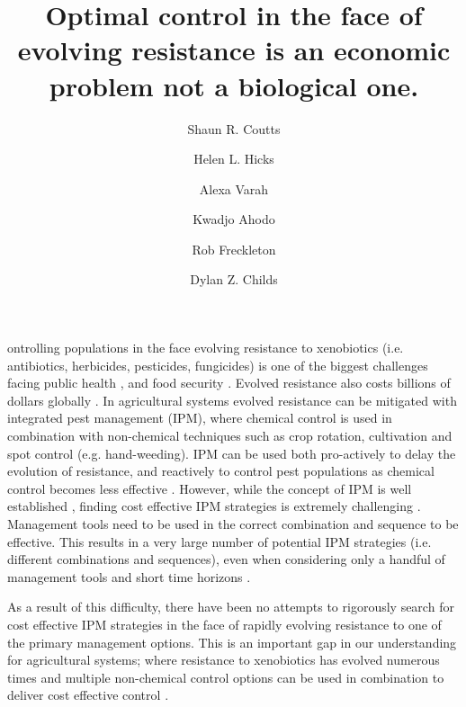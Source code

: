 \documentclass[9pt,twocolumn,twoside,lineno]{pnas-new}
\title{Optimal control in the face of evolving resistance is an economic problem not a biological one.}
\author[a,1]{Shaun R. Coutts}
\author[a]{Helen L. Hicks}
\author[b]{Alexa Varah}
\author[c]{Kwadjo Ahodo}
\author[a]{Rob Freckleton}
\author[a]{Dylan Z. Childs}
\affil[a]{Animal and Plant Sciences, University of Sheffield, Sheffield S10 2TN, UK}
\affil[b]{Zoological Society of London, London NW1 4RY, UK}
\affil[c]{Kwadjo What should I put down here}
\begin{document}
\verticaladjustment{-2pt}

\maketitle
\thispagestyle{firststyle}

ontrolling populations in the face evolving resistance to xenobiotics (i.e. antibiotics, herbicides, pesticides, fungicides) is one of the biggest challenges facing public health \citep{Laxm2016, Willy2017}, and food security \citep{Denh1992, Palu2001, Hick2018}. Evolved resistance also costs billions of dollars globally \citep{Livi2016, Ches2018, Hick2018}. In agricultural systems evolved resistance can be mitigated with integrated pest management (IPM), where chemical control is used in combination with non-chemical techniques such as crop rotation, cultivation and spot control (e.g. hand-weeding). IPM can be used both pro-actively to delay the evolution of resistance, and reactively to control pest populations as chemical control becomes less effective \citep{Denh1992, Hick2018}. However, while the concept of IPM is well established \citep{Bott1979}, finding cost effective IPM strategies is extremely challenging \citep{Dana2014, Chal2015}. Management tools need to be used in the correct combination and sequence to be effective. This results in a very large number of potential IPM strategies (i.e. different combinations and sequences), even when considering only a handful of management tools and short time horizons \citep{Chal2015}. 

As a result of this difficulty, there have been no attempts to rigorously search for cost effective IPM strategies in the face of rapidly evolving resistance to one of the primary management options. This is an important gap in our understanding for agricultural systems; where resistance to xenobiotics has evolved numerous times \citep{Denh1992, Palu2001} and multiple non-chemical control options can be used in combination to deliver cost effective control \citep{Chal2015}.      
\end{document}
